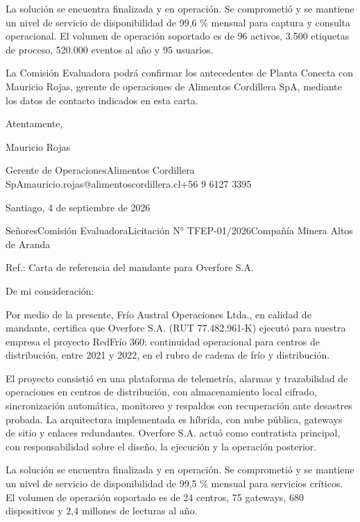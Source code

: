 \documentclass[anexo]{../../comun/overfore}
\begin{document}
La solución se encuentra finalizada y en operación. Se comprometió y se mantiene un nivel de servicio de disponibilidad de 99,6 \% mensual para captura y consulta operacional. El volumen de operación soportado es de 96 activos, 3.500 etiquetas de proceso, 520.000 eventos al año y 95 usuarios.

La Comisión Evaluadora podrá confirmar los antecedentes de Planta Conecta con Mauricio Rojas, gerente de operaciones de Alimentos Cordillera SpA, mediante los datos de contacto indicados en esta carta.

Atentamente,

Mauricio Rojas

Gerente de Operaciones\newline Alimentos Cordillera SpA\newline mauricio.rojas@alimentoscordillera.cl\newline +56 9 6127 3395

\enlargethispage{4\baselineskip}
Santiago, 4 de septiembre de 2026

Señores\newline Comisión Evaluadora\newline Licitación N° TFEP-01/2026\newline Compañía Minera Altos de Aranda

Ref.: Carta de referencia del mandante para Overfore S.A.

De mi consideración:

Por medio de la presente, Frío Austral Operaciones Ltda., en calidad de mandante, certifica que Overfore S.A. (RUT 77.482.961-K) ejecutó para nuestra empresa el proyecto RedFrío 360: continuidad operacional para centros de distribución, entre 2021 y 2022, en el rubro de cadena de frío y distribución.

El proyecto consistió en una plataforma de telemetría, alarmas y trazabilidad de operaciones en centros de distribución, con almacenamiento local cifrado, sincronización automática, monitoreo y respaldos con recuperación ante desastres probada. La arquitectura implementada es híbrida, con nube pública, gateways de sitio y enlaces redundantes. Overfore S.A. actuó como contratista principal, con responsabilidad sobre el diseño, la ejecución y la operación posterior.

La solución se encuentra finalizada y en operación. Se comprometió y se mantiene un nivel de servicio de disponibilidad de 99,5 \% mensual para servicios críticos. El volumen de operación soportado es de 24 centros, 75 gateways, 680 dispositivos y 2,4 millones de lecturas al año.
\end{document}

